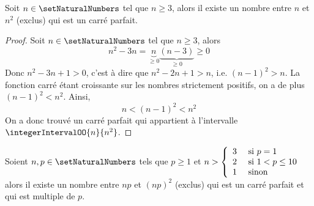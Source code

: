 \begin{lemma}
Soit $n \in \setNaturalNumbers$ tel que $n \ge 3$, alors il existe un nombre entre $n$ et $n^2$ (exclus) qui est un carré parfait. 
\end{lemma}

\begin{proof}
Soit $n \in \setNaturalNumbers$ tel que $n \ge 3$, alors
\[
n^2 - 3n = \underbrace{n}_{\ge 0} \underbrace{(n- 3)}_{\ge 0} \ge 0
\]
Donc $n^2 - 3n + 1 > 0$, c'est à dire que $n^2 - 2n + 1 > n$, i.e. $(n-1)^2 > n$. La fonction carré étant croissante sur les nombres strictement positifs, on a de plus $(n-1)^2 < n^2$. Ainsi, 
\[
n < (n-1)^2 < n^2
\]
On a donc trouvé un carré parfait qui appartient à l'intervalle $\integerIntervalOO{n}{n^2}$.
\end{proof}

\begin{lemma}
Soient $n, p\in \setNaturalNumbers$ tels que $p \ge 1$ et $n >
\left\{
\begin{array}{l l}
3 &\text{ si }  p = 1\\
2 &\text{ si }  1 < p \le 10\\
1 &\text{ sinon}\\
\end{array} 
\right.$\\
alors il existe un nombre entre $np$ et $(np)^2$ (exclus) qui est un carré parfait et qui est multiple de $p$. 
\end{lemma}

